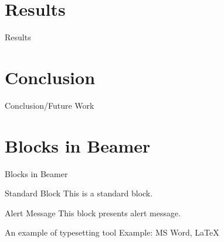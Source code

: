 \documentclass{beamer}
\begin{document}
	\section{Results}
	\begin{frame}{Results}
		
		
	\end{frame}

	\section{Conclusion}
	\begin{frame}{Conclusion/Future Work}
		
		
	\end{frame}
		
	\section{Blocks in Beamer}
	\begin{frame}{Blocks in Beamer}
		\begin{block}{Standard Block}
			This is a standard block.
		\end{block}
		\begin{alertblock}{Alert Message}
			This block presents alert message.
		\end{alertblock}
		\begin{exampleblock}{An example of typesetting tool}
			Example: MS Word, \LaTeX{}
		\end{exampleblock}
	\end{frame} 
	
\end{document}
